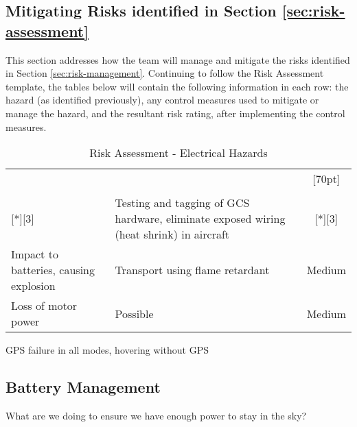 \label{sec:risk-management}
\subsection{Mitigating Risks identified in Section \ref{sec:risk-assessment}}
This section addresses how the team will manage and mitigate the risks identified in Section \ref{sec:risk-management}. Continuing to follow the Risk Assessment template, the tables below will contain the following information in each row: the hazard (as identified previously), any control measures used to mitigate or manage the hazard, and the resultant risk rating, after implementing the control measures.\\

\begin{table}[!h]
	\label{tab:management-electrical}
	\centering
	\begin{tabularx}{\textwidth}{|Y|Y|c|}
		\hline		
		 &  & \\
		& & \\
		\hline
		 & Testing and tagging of GCS hardware, eliminate exposed wiring (heat shrink) in aircraft & \\
		\hline
		Impact to batteries, causing explosion & Transport using flame retardant  & Medium\\
		\hline
		Loss of motor power & Possible & Medium\\		
		\hline
	\end{tabularx} 
	\caption{Risk Assessment - Electrical Hazards}
\end{table}

GPS failure in all modes, hovering without GPS

\subsection{Battery Management}
What are we doing to ensure we have enough power to stay in the sky?